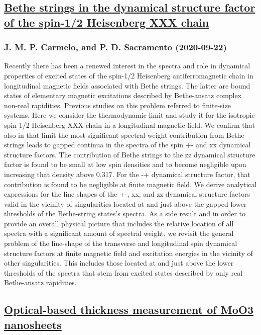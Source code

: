 {\subsection*{\href{http://arxiv.org/abs/2009.10499v1}{Bethe strings in the dynamical structure factor of the spin-1/2  Heisenberg XXX chain}}
\subsubsection*{J. M. P. Carmelo, and P. D. Sacramento (2020-09-22)}
Recently there has been a renewed interest in the spectra and role in
dynamical properties of excited states of the spin-1/2 Heisenberg
antiferromagnetic chain in longitudinal magnetic fields associated with Bethe
strings. The latter are bound states of elementary magnetic excitations
described by Bethe-ansatz complex non-real rapidities. Previous studies on this
problem referred to finite-size systems. Here we consider the thermodynamic
limit and study it for the isotropic spin-1/2 Heisenberg XXX chain in a
longitudinal magnetic field. We confirm that also in that limit the most
significant spectral weight contribution from Bethe strings leads to gapped
continua in the spectra of the spin +- and xx dynamical structure factors. The
contribution of Bethe strings to the zz dynamical structure factor is found to
be small at low spin densities and to become negligible upon increasing that
density above 0.317. For the -+ dynamical structure factor, that contribution
is found to be negligible at finite magnetic field. We derive analytical
expressions for the line shapes of the +-, xx, and zz dynamical structure
factors valid in the vicinity of singularities located at and just above the
gapped lower thresholds of the Bethe-string states's spectra. As a side result
and in order to provide an overall physical picture that includes the relative
location of all spectra with a significant amount of spectral weight, we
revisit the general problem of the line-shape of the transverse and
longitudinal spin dynamical structure factors at finite magnetic field and
excitation energies in the vicinity of other singularities. This includes those
located at and just above the lower thresholds of the spectra that stem from
excited states described by only real Bethe-ansatz rapidities.

\subsection*{\href{http://arxiv.org/abs/2009.10495v1}{Optical-based thickness measurement of MoO3 nanosheets}}
}
